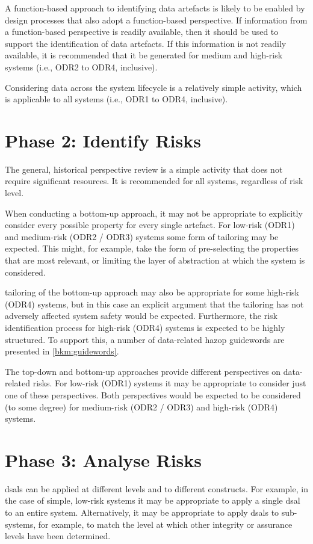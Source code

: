 A function-based approach to identifying \glspl{data artefact} is likely to be enabled by design processes that also adopt a function-based perspective. If \gls{information} from a function-based perspective is readily available, then it should be used to support the identification of \glspl{data artefact}. If this \gls{information} is not readily available, it is recommended that it be generated for medium and high-risk systems (i.e., ODR2 to ODR4, inclusive).

Considering data across the system lifecycle is a relatively simple activity, which is applicable to all systems (i.e., ODR1 to ODR4, inclusive).

\section{Phase 2: Identify Risks}
The general, historical perspective review is a simple activity that does not require significant resources. It is recommended for all systems, regardless of risk level.

When conducting a bottom-up approach, it may not be appropriate to explicitly consider every possible property for every single artefact. For low-risk (ODR1) and medium-risk (ODR2 / ODR3) systems some form of \gls{tailoring} may be expected. This might, for example, take the form of pre-selecting the properties that are most relevant, or limiting the layer of abstraction at which the system is considered.

\Gls{tailoring} of the bottom-up approach may also be appropriate for some high-risk (ODR4) systems, but in this case an explicit argument that the \gls{tailoring} has not adversely affected system safety would be expected. Furthermore, the risk identification process for high-risk (ODR4) systems is expected to be highly structured. To support this, a number of data-related \gls{hazop} guidewords are presented in \autoref{bkm:guidewords}.

The top-down and bottom-up approaches provide different perspectives on data-related risks. For low-risk (ODR1) systems it may be appropriate to consider just one of these perspectives. Both perspectives would be expected to be considered (to some degree) for medium-risk (ODR2 / ODR3) and high-risk (ODR4) systems.

\section{Phase 3: Analyse Risks}\label{bkm:activities:analyse:tailoring}
\glspl{dsal} can be applied at different levels and to different constructs. For example, in the case of simple, low-risk systems it may be appropriate to apply a single \gls{dsal} to an entire system. Alternatively, it may be appropriate to apply \glspl{dsal} to sub-systems, for example, to match the level at which other \gls{integrity} or assurance levels have been determined. 

